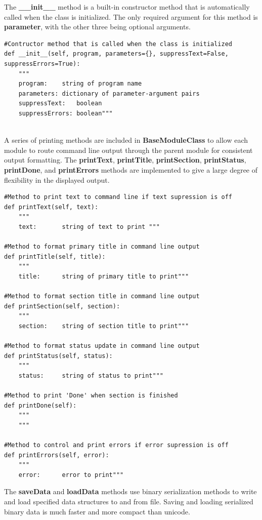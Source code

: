 The \textbf{\_\_init\_\_} method is a built-in constructor method that is automatically called when the class is initialized. The only required argument for this method is \textbf{parameter}, with the other three being optional arguments. 

\begin{lstlisting}[frame=single]
#Contructor method that is called when the class is initialized
def __init__(self, program, parameters={}, suppressText=False, suppressErrors=True):
	"""
	program:	string of program name
	parameters:	dictionary of parameter-argument pairs
	suppressText:	boolean
	suppressErrors:	boolean"""
	
\end{lstlisting}

A series of printing methods are included in \textbf{BaseModuleClass} to allow each module to route command line output through the parent module for consistent output formatting. The \textbf{printText}, \textbf{printTitle}, \textbf{printSection}, \textbf{printStatus}, \textbf{printDone}, and \textbf{printErrors} methods are implemented to give a large degree of flexibility in the displayed output.

\begin{lstlisting}[frame=single]
#Method to print text to command line if text supression is off
def printText(self, text):
	"""
	text:		string of text to print """
	
#Method to format primary title in command line output 
def printTitle(self, title):
	"""
	title:		string of primary title to print"""
	
#Method to format section title in command line output 
def printSection(self, section):
	"""
	section:	string of section title to print"""
	
#Method to format status update in command line output 
def printStatus(self, status):
	"""
	status:		string of status to print"""
	
#Method to print 'Done' when section is finished 
def printDone(self):
	"""	
	"""
	
#Method to control and print errors if error supression is off
def printErrors(self, error):
	"""
	error:		error to print"""
\end{lstlisting}

The \textbf{saveData} and \textbf{loadData} methods use binary serialization methods to write and load specified data structures to and from file. Saving and loading serialized binary data is much faster and more compact than unicode.


